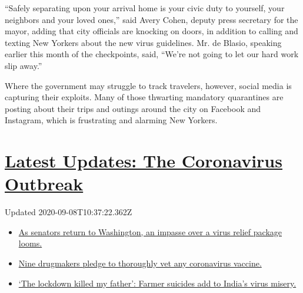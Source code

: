 ``Safely separating upon your arrival home is your civic duty to
yourself, your neighbors and your loved ones,'' said Avery Cohen, deputy
press secretary for the mayor, adding that city officials are knocking
on doors, in addition to calling and texting New Yorkers about the new
virus guidelines. Mr. de Blasio, speaking earlier this month of the
checkpoints, said, ``We're not going to let our hard work slip away.''

Where the government may struggle to track travelers, however, social
media is capturing their exploits. Many of those thwarting mandatory
quarantines are posting about their trips and outings around the city on
Facebook and Instagram, which is frustrating and alarming New Yorkers.

\hypertarget{latest-updates-the-coronavirus-outbreak}{%
\section{\texorpdfstring{\href{https://www.nytimes3xbfgragh.onion/2020/09/08/world/covid-19-coronavirus.html?action=click\&pgtype=Article\&state=default\&region=MAIN_CONTENT_1\&context=storylines_live_updates}{Latest
Updates: The Coronavirus
Outbreak}}{Latest Updates: The Coronavirus Outbreak}}\label{latest-updates-the-coronavirus-outbreak}}

Updated 2020-09-08T10:37:22.362Z

\begin{itemize}
\tightlist
\item
  \href{https://www.nytimes3xbfgragh.onion/2020/09/08/world/covid-19-coronavirus.html?action=click\&pgtype=Article\&state=default\&region=MAIN_CONTENT_1\&context=storylines_live_updates\#link-4a77847f}{As
  senators return to Washington, an impasse over a virus relief package
  looms.}
\item
  \href{https://www.nytimes3xbfgragh.onion/2020/09/08/world/covid-19-coronavirus.html?action=click\&pgtype=Article\&state=default\&region=MAIN_CONTENT_1\&context=storylines_live_updates\#link-679303d7}{Nine
  drugmakers pledge to thoroughly vet any coronavirus vaccine.}
\item
  \href{https://www.nytimes3xbfgragh.onion/2020/09/08/world/covid-19-coronavirus.html?action=click\&pgtype=Article\&state=default\&region=MAIN_CONTENT_1\&context=storylines_live_updates\#link-1c973131}{`The
  lockdown killed my father': Farmer suicides add to India's virus
  misery.}
\end{itemize}

